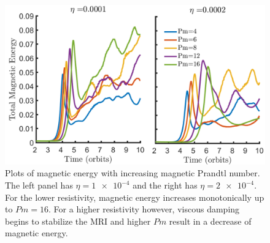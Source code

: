 %
\begin{figure}[h]
  \begin{center}  
    \includegraphics [width=\textwidth, angle=0.]{img/eta1-2-PmME16.png}
  \end{center}
  \caption{Plots of magnetic energy with increasing magnetic Prandtl number. The left panel has $\eta=\num{1e-4}$ and the right has $\eta=\num{2e-4}$. For the lower resistivity, magnetic energy increases monotonically up to $Pm=16$. For a higher resistivity however, viscous damping begins to stabilize the MRI and higher $Pm$ result in a decrease of  magnetic energy.}
  \label{fig:nstokesPm}
\end{figure}
%
